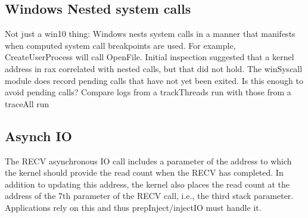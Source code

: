 \documentclass[titlepage]{article}
\begin{document}
\begin{appendices}
\begin{verbatim}
\end{verbatim}
\subsection{Windows Nested system calls}
Not just a win10 thing:  Windows nests system calls in a manner that manifests when computed system call
breakpoints are used.  For example, CreateUserProcess will call OpenFile.  Initial inspection suggested that
a kernel address in rax correlated with nested calls, but that did not hold.  The winSyscall module does
record pending calls that have not yet been exited.  Is this enough to avoid pending calls?
Compare logs from a trackThreads run with those from a traceAll run
\subsection{Asynch IO}
The RECV asynchronous IO call includes a parameter of the address to which the kernel should provide the read count when
the RECV has completed.  In addition to updating this address, the kernel also places the read count at the address of
the 7th parameter of the RECV call, i.e., the third stack parameter.  Applications rely on this and thus prepInject/injectIO
must handle it.

\end{appendices}
\end{document}
